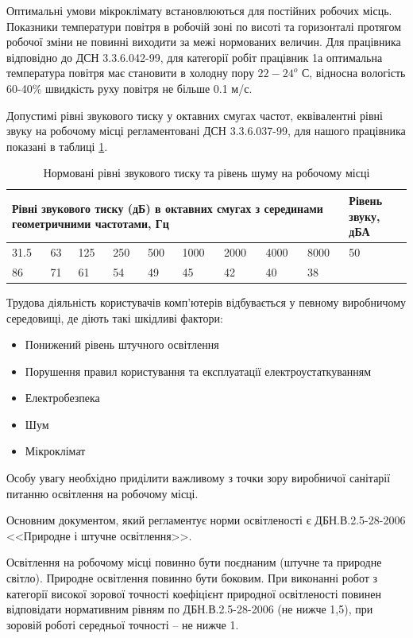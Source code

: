 \documentclass[ukrainian,utf8,simple,floatsubsection, hpadding=5mm,equationsubsection,]{eskdtext}
\begin{document}
Оптимальні умови мікроклімату встановлюються для постійних робочих місць. Показники температури повітря в робочій зоні по висоті та горизонталі протягом робочої зміни не повинні виходити за межі нормованих величин. Для працівника відповідно до ДСН 3.3.6.042-99, для категорії робіт працівник 1а оптимальна температура повітря має становити в холодну пору $22-24^o$ С, відносна вологість 60-40\% швидкість руху повітря не більше 0.1 м/с.

Допустимі рівні звукового тиску у октавних смугах частот, еквівалентні рівні звуку на робочому місці регламентовані ДСН 3.3.6.037-99, для нашого працівника показані в таблиці \ref{tb:noise}.
\begin{table}[H]
\small
\caption{Нормовані рівні звукового тиску та рівень шуму на робочому місці}
\centering
\begin{tabular}{|p{0.4in}|p{0.4in}|p{0.4in}|p{0.4in}|p{0.4in}|p{0.4in}|p{0.4in}|p{0.4in}|p{0.4in}|p{0.4in}|} \hline 
\multicolumn{9}{|p{4in}|}{Рівні звукового тиску (дБ) в  октавних смугах з серединами геометричними частотами, Гц} & Рівень звуку, дБА \\ \hline 
31.5 & 63 & 125 & 250 & 500 & 1000 & 2000 & 4000 & 8000 & 50 \\ \hline 
86 & 71 & 61 & 54 & 49 & 45 & 42 & 40 & 38 &  \\ \hline 
\end{tabular}
\label{tb:noise}
\end{table}




Трудова діяльність користувачів комп’ютерів відбувається у певному виробничому середовищі, де 
діють такі шкідливі фактори: 
\begin{itemize}
  \item Понижений рівень штучного освітлення 
  \item Порушення правил користування та експлуатації електроустаткуванням
  \item Електробезпека
  \item Шум
  \item Мікроклімат
\end{itemize}


Особу увагу необхідно приділити важливому з точки зору виробничої санітарії 
питанню освітлення на робочому місці.


Основним документом, який регламентує норми освітленості є ДБН.В.2.5-28-2006
<<Природне і штучне освітлення>>. 

Освітлення на робочому місці повинно бути поєднаним (штучне та природне світло). 
Природне освітлення повинно бути боковим. При виконанні робот з категорії високої 
зорової точності коефіцієнт природної освітленості повинен відповідати нормативним 
рівням по ДБН.В.2.5-28-2006 (не нижче 1,5), при зоровій роботі середньої точності – не нижче 1.
\end{document}
